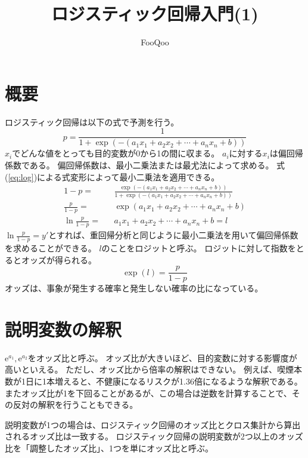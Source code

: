 \documentclass{ltjsarticle}
\title{ロジスティック回帰入門(1)}
\author{FooQoo}
\begin{document}
\maketitle
\section{概要}
ロジスティック回帰は以下の式で予測を行う。
\begin{equation}
    p = \frac{1}{1+\exp(-(a_1 x_1 + a_2 x_2 + \cdots + a_n x_n + b))}
\end{equation}
$x_i$でどんな値をとっても目的変数が0から1の間に収まる。
$a_i$に対する$x_i$は偏回帰係数である。
偏回帰係数は、最小二乗法または最尤法によって求める。
式(\ref{eq:log})による式変形によって最小二乗法を適用できる。
\begin{eqnarray}
    1 - p =& &\frac{\exp(-(a_1 x_1 + a_2 x_2 + \cdots + a_n x_n + b))}{1 + \exp(-(a_1 x_1 + a_2 x_2 + \cdots + a_n x_n + b))} \\
    \frac{p}{1-p} =& &\exp(a_1 x_1 + a_2 x_2 + \cdots + a_n x_n + b) \\
    \ln{\frac{p}{1-p}} =& &a_1 x_1 + a_2 x_2 + \cdots + a_n x_n + b = l
    \label{eq:log}
\end{eqnarray}
$\ln{\frac{p}{1-p}}=y'$とすれば、重回帰分析と同じように最小二乗法を用いて偏回帰係数を求めることができる。
$l$のことをロジットと呼ぶ。
ロジットに対して指数をとるとオッズが得られる。
\begin{equation}
    \exp(l) = \frac{p}{1-p}
\end{equation}
オッズは、事象が発生する確率と発生しない確率の比になっている。

\section{説明変数の解釈}
$\mathrm{e}^{a_1}, \mathrm{e}^{a_2}$をオッズ比と呼ぶ。
オッズ比が大きいほど、目的変数に対する影響度が高いといえる。
ただし、オッズ比から倍率の解釈はできない。
例えば、喫煙本数が1日に1本増えると、不健康になるリスクが1.36倍になるような解釈である。
またオッズ比が1を下回ることがあるが、この場合は逆数を計算することで、その反対の解釈を行うこともできる。

説明変数が1つの場合は、ロジスティック回帰のオッズ比とクロス集計から算出されるオッズ比は一致する。
ロジスティック回帰の説明変数が2つ以上のオッズ比を「調整したオッズ比」、1つを単にオッズ比と呼ぶ。
\end{document}
